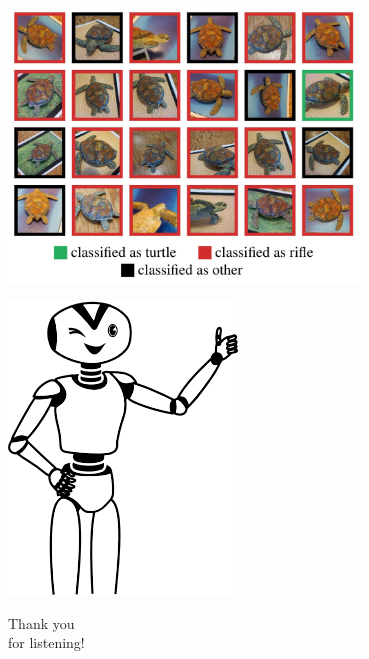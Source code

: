 \documentclass[aspectratio=169,x11names]{beamer}
\begin{document}
\begin{frame}
\begin{center}
\includegraphics[width=0.7\textwidth]{images/turtle_class} 
\end{center}
\end{frame}

\begin{frame}[fragile]
\begin{multicols}{2}

\vspace*{60pt}
\includegraphics[scale=0.6]{images/Happy-Thumbs-Up-Robot.png} 

\columnbreak

\vspace*{60pt}

\Huge
\hspace*{-30pt}Thank you\\ \hspace*{-20pt} for listening!
\end{multicols}
\end{frame}
\end{document}
